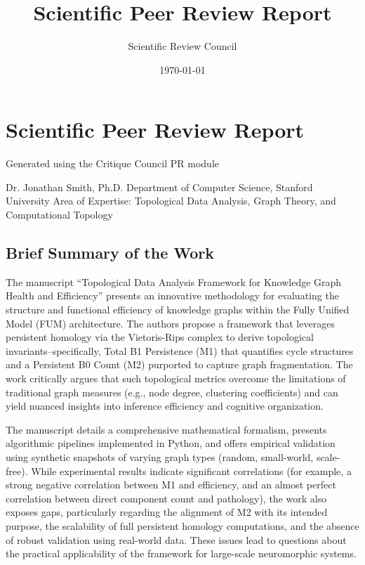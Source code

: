 \documentclass{article}
\title{Scientific Peer Review Report}
\author{Scientific Review Council}
\date{\today}
\begin{document}
\maketitle

\section{Scientific Peer Review Report}
Generated using the Critique Council PR module

\hrulefill

Dr. Jonathan Smith, Ph.D.  
Department of Computer Science, Stanford University  
Area of Expertise: Topological Data Analysis, Graph Theory, and Computational Topology  

\hrulefill
\subsection{Brief Summary of the Work}

The manuscript “Topological Data Analysis Framework for Knowledge Graph Health and Efficiency” presents an innovative methodology for evaluating the structure and functional efficiency of knowledge graphs within the Fully Unified Model (FUM) architecture. The authors propose a framework that leverages persistent homology via the Vietoris-Rips complex to derive topological invariants--specifically, Total B1 Persistence (M1) that quantifies cycle structures and a Persistent B0 Count (M2) purported to capture graph fragmentation. The work critically argues that such topological metrics overcome the limitations of traditional graph measures (e.g., node degree, clustering coefficients) and can yield nuanced insights into inference efficiency and cognitive organization.

The manuscript details a comprehensive mathematical formalism, presents algorithmic pipelines implemented in Python, and offers empirical validation using synthetic snapshots of varying graph types (random, small-world, scale-free). While experimental results indicate significant correlations (for example, a strong negative correlation between M1 and efficiency, and an almost perfect correlation between direct component count and pathology), the work also exposes gaps, particularly regarding the alignment of M2 with its intended purpose, the scalability of full persistent homology computations, and the absence of robust validation using real-world data. These issues lead to questions about the practical applicability of the framework for large-scale neuromorphic systems.
\end{document}
